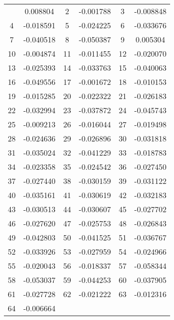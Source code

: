 \documentclass[12pt]{article}
\begin{document}
\begin{longtable}{@{}cc|cc|cc@{}}
\bottomrule
\endlastfoot
1 & 0.008804 & 2 & -0.001788 & 3 & -0.008848 \\
4 & -0.018591 & 5 & -0.024225 & 6 & -0.033676 \\
7 & -0.040518 & 8 & -0.050387 & 9 & 0.005304 \\
10 & -0.004874 & 11 & -0.011455 & 12 & -0.020070 \\
13 & -0.025393 & 14 & -0.033763 & 15 & -0.040063 \\
16 & -0.049556 & 17 & -0.001672 & 18 & -0.010153 \\
19 & -0.015285 & 20 & -0.022322 & 21 & -0.026183 \\
22 & -0.032994 & 23 & -0.037872 & 24 & -0.045743 \\
25 & -0.009213 & 26 & -0.016044 & 27 & -0.019498 \\
28 & -0.024636 & 29 & -0.026896 & 30 & -0.031818 \\
31 & -0.035024 & 32 & -0.041229 & 33 & -0.018783 \\
34 & -0.023358 & 35 & -0.024542 & 36 & -0.027450 \\
37 & -0.027440 & 38 & -0.030159 & 39 & -0.031122 \\
40 & -0.035161 & 41 & -0.030619 & 42 & -0.032183 \\
43 & -0.030513 & 44 & -0.030607 & 45 & -0.027702 \\
46 & -0.027620 & 47 & -0.025753 & 48 & -0.026843 \\
49 & -0.042803 & 50 & -0.041525 & 51 & -0.036767 \\
52 & -0.033926 & 53 & -0.027959 & 54 & -0.024966 \\
55 & -0.020043 & 56 & -0.018337 & 57 & -0.058344 \\
58 & -0.053037 & 59 & -0.044253 & 60 & -0.037905 \\
61 & -0.027728 & 62 & -0.021222 & 63 & -0.012316 \\
64 & -0.006664 &  &  &  &  \\

\end{longtable}
\end{document}
